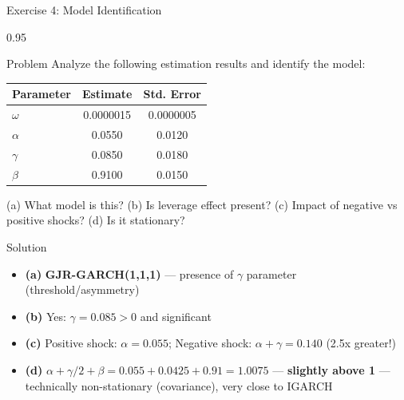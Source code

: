 \documentclass[9pt, aspectratio=169, t]{beamer}
\begin{document}
\begin{frame}{Exercise 4: Model Identification}
    \begin{cminipage}{0.95\textwidth}
    {\footnotesize
    \begin{alertblock}{Problem}
        Analyze the following estimation results and identify the model:
        \begin{center}
            \footnotesize
            \begin{tabular}{lcc}
                \toprule
                \textbf{Parameter} & \textbf{Estimate} & \textbf{Std. Error} \\
                \midrule
                $\omega$ & 0.0000015 & 0.0000005 \\
                $\alpha$ & 0.0550 & 0.0120 \\
                $\gamma$ & 0.0850 & 0.0180 \\
                $\beta$ & 0.9100 & 0.0150 \\
                \bottomrule
            \end{tabular}
        \end{center}
        (a) What model is this? (b) Is leverage effect present? (c) Impact of negative vs positive shocks? (d) Is it stationary?
    \end{alertblock}

    \vspace{0.1cm}
    \begin{exampleblock}{Solution}
        \begin{itemize}\setlength{\itemsep}{0pt}
            \item \textbf{(a)} \textbf{GJR-GARCH(1,1,1)} --- presence of $\gamma$ parameter (threshold/asymmetry)
            \item \textbf{(b)} Yes: $\gamma = 0.085 > 0$ and significant
            \item \textbf{(c)} Positive shock: $\alpha = 0.055$; Negative shock: $\alpha + \gamma = 0.140$ (2.5x greater!)
            \item \textbf{(d)} $\alpha + \gamma/2 + \beta = 0.055 + 0.0425 + 0.91 = 1.0075$ --- \textbf{slightly above 1} --- technically non-stationary (covariance), very close to IGARCH
        \end{itemize}
    \end{exampleblock}
    }
    \end{cminipage}
\end{frame}
\end{document}
